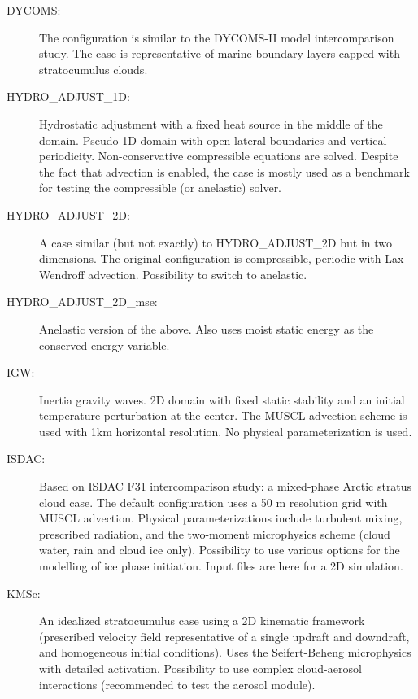 \documentclass[12pt,A4,french]{article}
\begin{document}
\begin{description}
\item[DYCOMS:]

The configuration is similar to the DYCOMS-II model intercomparison study. The case is representative of marine boundary layers capped with stratocumulus clouds. 

\item[HYDRO\_ADJUST\_1D:]

Hydrostatic adjustment with a fixed heat source in the middle of the domain. Pseudo 1D domain with open lateral boundaries and vertical periodicity. Non-conservative compressible equations are solved. Despite the fact that advection is enabled, the case is mostly used as a benchmark for testing the compressible (or anelastic) solver.

\item[HYDRO\_ADJUST\_2D:]

A case similar (but not exactly) to HYDRO\_ADJUST\_2D but in two dimensions. The original configuration is compressible, periodic with Lax-Wendroff advection. Possibility to switch to anelastic.

\item[HYDRO\_ADJUST\_2D\_mse:]

Anelastic version of the above. Also uses moist static energy as the conserved energy variable.

\item[IGW:]

Inertia gravity waves. 2D domain with fixed static stability and an initial temperature perturbation at the center. The MUSCL advection scheme is used with 1km horizontal resolution. No physical parameterization is used.

\item[ISDAC:]

Based on ISDAC F31 intercomparison study: a mixed-phase Arctic stratus cloud case. The default configuration uses a 50 m resolution grid with MUSCL advection. Physical parameterizations include turbulent mixing, prescribed radiation, and the two-moment microphysics scheme (cloud water, rain and cloud ice only). Possibility to use various options for the modelling of ice phase initiation. Input files are here for a 2D simulation.

\item[KMSc:]

An idealized stratocumulus case using a 2D kinematic framework (prescribed velocity field representative of a single updraft and downdraft, and homogeneous initial conditions). Uses the Seifert-Beheng microphysics with detailed activation. Possibility to use complex cloud-aerosol interactions (recommended to test the aerosol module).


\end{description}
\end{document}
